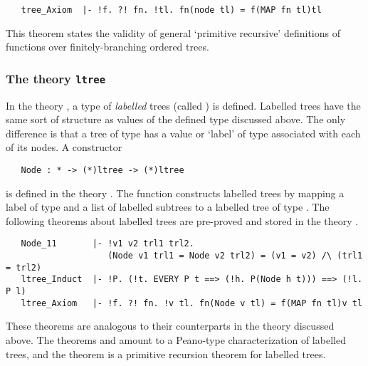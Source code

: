 {{\begin{hol}
\begin{verbatim}
   tree_Axiom  |- !f. ?! fn. !tl. fn(node tl) = f(MAP fn tl)tl
\end{verbatim}\end{hol}

\noindent This theorem states the validity of general `primitive recursive'
definitions of functions over finitely-branching ordered trees.

\subsubsection{The theory {\tt ltree}}

In the theory , a type of {\it
labelled\/} trees (called ) is defined. Labelled trees have the
same sort of structure as values of the defined type  discussed above.
The only difference is that a tree of type  has a value or `label'
of type \ml{*} associated with each of its nodes.  A constructor

\begin{hol}
\begin{verbatim}
   Node : * -> (*)ltree -> (*)ltree
\end{verbatim}\end{hol}

\noindent is defined in the theory .  The function 
constructs labelled trees by mapping a label of type \ml{*} and a list of
labelled subtrees to a labelled tree of type .
The following theorems
 about labelled trees are pre-proved and stored in the
theory .


\begin{hol}
\begin{verbatim}
   Node_11       |- !v1 v2 trl1 trl2.
                    (Node v1 trl1 = Node v2 trl2) = (v1 = v2) /\ (trl1 = trl2)
   ltree_Induct  |- !P. (!t. EVERY P t ==> (!h. P(Node h t))) ==> (!l. P l)
   ltree_Axiom   |- !f. ?! fn. !v tl. fn(Node v tl) = f(MAP fn tl)v tl
\end{verbatim}\end{hol}

\noindent These  theorems  are  analogous to  their counterparts  in the theory
 discussed  above.    The theorems   
and  amount to a Peano-type characterization of labelled
trees, and the theorem  is a primitive recursion theorem for
labelled trees.

}}
